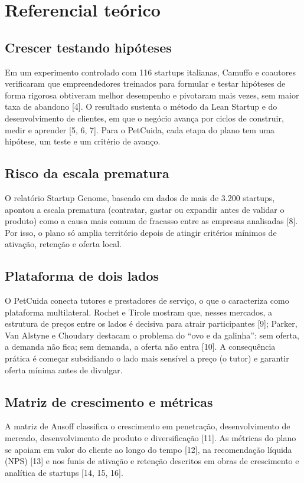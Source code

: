 \section{Referencial teórico}

\subsection{Crescer testando hipóteses}

Em um experimento controlado com 116 startups italianas, Camuffo e coautores verificaram que empreendedores treinados para formular e testar hipóteses de forma rigorosa obtiveram melhor desempenho e pivotaram mais vezes, sem maior taxa de abandono [4]. O resultado sustenta o método da Lean Startup e do desenvolvimento de clientes, em que o negócio avança por ciclos de construir, medir e aprender [5, 6, 7]. Para o PetCuida, cada etapa do plano tem uma hipótese, um teste e um critério de avanço.

\subsection{Risco da escala prematura}

O relatório Startup Genome, baseado em dados de mais de 3.200 startups, apontou a escala prematura (contratar, gastar ou expandir antes de validar o produto) como a causa mais comum de fracasso entre as empresas analisadas [8]. Por isso, o plano só amplia território depois de atingir critérios mínimos de ativação, retenção e oferta local.

\subsection{Plataforma de dois lados}

O PetCuida conecta tutores e prestadores de serviço, o que o caracteriza como plataforma multilateral. Rochet e Tirole mostram que, nesses mercados, a estrutura de preços entre os lados é decisiva para atrair participantes [9]; Parker, Van Alstyne e Choudary destacam o problema do ``ovo e da galinha'': sem oferta, a demanda não fica; sem demanda, a oferta não entra [10]. A consequência prática é começar subsidiando o lado mais sensível a preço (o tutor) e garantir oferta mínima antes de divulgar.

\subsection{Matriz de crescimento e métricas}

A matriz de Ansoff classifica o crescimento em penetração, desenvolvimento de mercado, desenvolvimento de produto e diversificação [11]. As métricas do plano se apoiam em valor do cliente ao longo do tempo [12], na recomendação líquida (NPS) [13] e nos funis de ativação e retenção descritos em obras de crescimento e analítica de startups [14, 15, 16].
